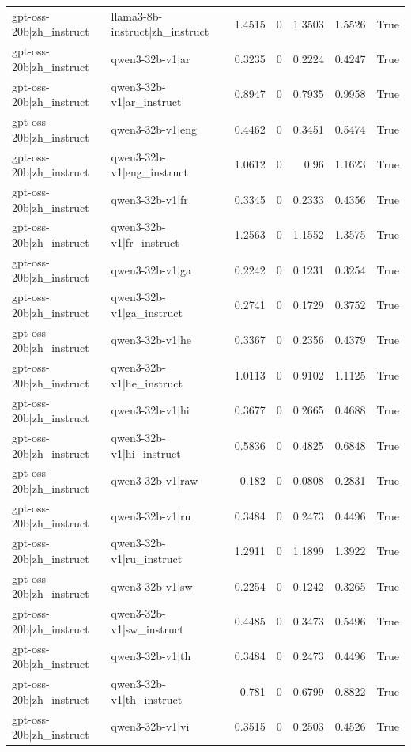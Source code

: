\begin{table}
\begin{tabular}{l l r r r r l}
gpt-oss-20b|zh_instruct & llama3-8b-instruct|zh_instruct & 1.4515 & 0 & 1.3503 & 1.5526 & True \\
gpt-oss-20b|zh_instruct & qwen3-32b-v1|ar & 0.3235 & 0 & 0.2224 & 0.4247 & True \\
gpt-oss-20b|zh_instruct & qwen3-32b-v1|ar_instruct & 0.8947 & 0 & 0.7935 & 0.9958 & True \\
gpt-oss-20b|zh_instruct & qwen3-32b-v1|eng & 0.4462 & 0 & 0.3451 & 0.5474 & True \\
gpt-oss-20b|zh_instruct & qwen3-32b-v1|eng_instruct & 1.0612 & 0 & 0.96 & 1.1623 & True \\
gpt-oss-20b|zh_instruct & qwen3-32b-v1|fr & 0.3345 & 0 & 0.2333 & 0.4356 & True \\
gpt-oss-20b|zh_instruct & qwen3-32b-v1|fr_instruct & 1.2563 & 0 & 1.1552 & 1.3575 & True \\
gpt-oss-20b|zh_instruct & qwen3-32b-v1|ga & 0.2242 & 0 & 0.1231 & 0.3254 & True \\
gpt-oss-20b|zh_instruct & qwen3-32b-v1|ga_instruct & 0.2741 & 0 & 0.1729 & 0.3752 & True \\
gpt-oss-20b|zh_instruct & qwen3-32b-v1|he & 0.3367 & 0 & 0.2356 & 0.4379 & True \\
gpt-oss-20b|zh_instruct & qwen3-32b-v1|he_instruct & 1.0113 & 0 & 0.9102 & 1.1125 & True \\
gpt-oss-20b|zh_instruct & qwen3-32b-v1|hi & 0.3677 & 0 & 0.2665 & 0.4688 & True \\
gpt-oss-20b|zh_instruct & qwen3-32b-v1|hi_instruct & 0.5836 & 0 & 0.4825 & 0.6848 & True \\
gpt-oss-20b|zh_instruct & qwen3-32b-v1|raw & 0.182 & 0 & 0.0808 & 0.2831 & True \\
gpt-oss-20b|zh_instruct & qwen3-32b-v1|ru & 0.3484 & 0 & 0.2473 & 0.4496 & True \\
gpt-oss-20b|zh_instruct & qwen3-32b-v1|ru_instruct & 1.2911 & 0 & 1.1899 & 1.3922 & True \\
gpt-oss-20b|zh_instruct & qwen3-32b-v1|sw & 0.2254 & 0 & 0.1242 & 0.3265 & True \\
gpt-oss-20b|zh_instruct & qwen3-32b-v1|sw_instruct & 0.4485 & 0 & 0.3473 & 0.5496 & True \\
gpt-oss-20b|zh_instruct & qwen3-32b-v1|th & 0.3484 & 0 & 0.2473 & 0.4496 & True \\
gpt-oss-20b|zh_instruct & qwen3-32b-v1|th_instruct & 0.781 & 0 & 0.6799 & 0.8822 & True \\
gpt-oss-20b|zh_instruct & qwen3-32b-v1|vi & 0.3515 & 0 & 0.2503 & 0.4526 & True \\

\end{tabular}
\end{table}
